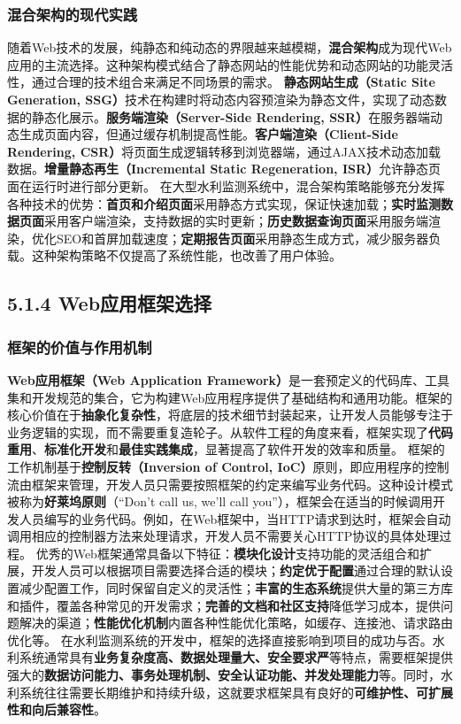 \subsubsection{混合架构的现代实践}\label{ux6df7ux5408ux67b6ux6784ux7684ux73b0ux4ee3ux5b9eux8df5}
随着Web技术的发展，纯静态和纯动态的界限越来越模糊，\textbf{混合架构}成为现代Web应用的主流选择。这种架构模式结合了静态网站的性能优势和动态网站的功能灵活性，通过合理的技术组合来满足不同场景的需求。
\textbf{静态网站生成（Static Site Generation, SSG）}技术在构建时将动态内容预渲染为静态文件，实现了动态数据的静态化展示。\textbf{服务端渲染（Server-Side Rendering,
SSR）}在服务器端动态生成页面内容，但通过缓存机制提高性能。\textbf{客户端渲染（Client-Side Rendering,
CSR）}将页面生成逻辑转移到浏览器端，通过AJAX技术动态加载数据。\textbf{增量静态再生（Incremental Static Regeneration, ISR）}允许静态页面在运行时进行部分更新。
在大型水利监测系统中，混合架构策略能够充分发挥各种技术的优势：\textbf{首页和介绍页面}采用静态方式实现，保证快速加载；\textbf{实时监测数据页面}采用客户端渲染，支持数据的实时更新；\textbf{历史数据查询页面}采用服务端渲染，优化SEO和首屏加载速度；\textbf{定期报告页面}采用静态生成方式，减少服务器负载。这种架构策略不仅提高了系统性能，也改善了用户体验。
\subsection{5.1.4 Web应用框架选择}\label{webux5e94ux7528ux6846ux67b6ux9009ux62e9}
\subsubsection{框架的价值与作用机制}\label{ux6846ux67b6ux7684ux4ef7ux503cux4e0eux4f5cux7528ux673aux5236} \textbf{Web应用框架（Web
Application
Framework）}是一套预定义的代码库、工具集和开发规范的集合，它为构建Web应用程序提供了基础结构和通用功能。框架的核心价值在于\textbf{抽象化复杂性}，将底层的技术细节封装起来，让开发人员能够专注于业务逻辑的实现，而不需要重复造轮子。从软件工程的角度来看，框架实现了\textbf{代码重用}、\textbf{标准化开发}和\textbf{最佳实践集成}，显著提高了软件开发的效率和质量。
框架的工作机制基于\textbf{控制反转（Inversion of Control,
IoC）}原则，即应用程序的控制流由框架来管理，开发人员只需要按照框架的约定来编写业务代码。这种设计模式被称为\textbf{好莱坞原则}（``Don't call us, we'll call
you''），框架会在适当的时候调用开发人员编写的业务代码。例如，在Web框架中，当HTTP请求到达时，框架会自动调用相应的控制器方法来处理请求，开发人员不需要关心HTTP协议的具体处理过程。
优秀的Web框架通常具备以下特征：\textbf{模块化设计}支持功能的灵活组合和扩展，开发人员可以根据项目需要选择合适的模块；\textbf{约定优于配置}通过合理的默认设置减少配置工作，同时保留自定义的灵活性；\textbf{丰富的生态系统}提供大量的第三方库和插件，覆盖各种常见的开发需求；\textbf{完善的文档和社区支持}降低学习成本，提供问题解决的渠道；\textbf{性能优化机制}内置各种性能优化策略，如缓存、连接池、请求路由优化等。
在水利监测系统的开发中，框架的选择直接影响到项目的成功与否。水利系统通常具有\textbf{业务复杂度高、数据处理量大、安全要求严}等特点，需要框架提供强大的\textbf{数据访问能力、事务处理机制、安全认证功能、并发处理能力}等。同时，水利系统往往需要长期维护和持续升级，这就要求框架具有良好的\textbf{可维护性、可扩展性和向后兼容性}。
